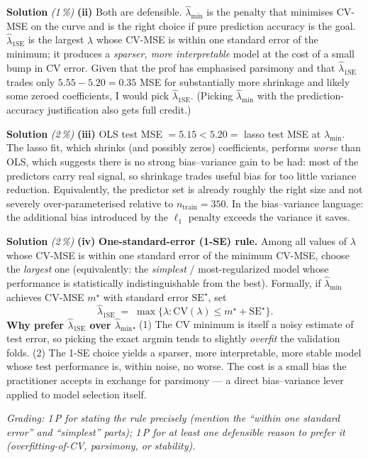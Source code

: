 \documentclass[11pt,a4paper]{article}
\newcommand{\subpoints}[1]{\textit{(#1\,\%)}}
\newcommand{\sol}{\noindent\textbf{Solution}}
\begin{document}
\medskip
\sol{} \subpoints{1} \textbf{(ii)} Both are defensible. \textbf{$\hat\lambda_{\min}$} is the
penalty that minimises CV-MSE on the curve and is the right choice if pure prediction accuracy is
the goal. \textbf{$\hat\lambda_{1\text{SE}}$} is the largest $\lambda$ whose CV-MSE is within one
standard error of the minimum; it produces a \emph{sparser, more interpretable} model at the cost
of a small bump in CV error. Given that the prof has emphasised parsimony and that
$\hat\lambda_{1\text{SE}}$ trades only $5.55-5.20 = 0.35$ MSE for substantially more shrinkage and
likely some zeroed coefficients, I would pick $\hat\lambda_{1\text{SE}}$. (Picking
$\hat\lambda_{\min}$ with the prediction-accuracy justification also gets full credit.)

\medskip
\sol{} \subpoints{2} \textbf{(iii)} OLS test MSE $=5.15<5.20=$ lasso test MSE at $\hat\lambda_{\min}$.
The lasso fit, which shrinks (and possibly zeros) coefficients, performs \emph{worse} than OLS,
which suggests there is no strong bias--variance gain to be had: most of the predictors carry real
signal, so shrinkage trades useful bias for too little variance reduction. Equivalently, the
predictor set is already roughly the right size and not severely over-parameterised relative to
$n_\text{train}=350$. In the bias--variance language: the additional bias introduced by the
$\ell_1$ penalty exceeds the variance it saves.

\medskip
\sol{} \subpoints{2} \textbf{(iv)} \textbf{One-standard-error (1-SE) rule.} Among all values of $\lambda$ whose CV-MSE is within one standard error of the minimum CV-MSE, choose the \emph{largest} one (equivalently: the \emph{simplest} / most-regularized model whose performance is statistically indistinguishable from the best). Formally, if $\hat\lambda_{\min}$ achieves CV-MSE $m^\star$ with standard error $\mathrm{SE}^\star$, set
$$\hat\lambda_{1\text{SE}} \;=\; \max\bigl\{\lambda : \mathrm{CV}(\lambda)\leq m^\star + \mathrm{SE}^\star\bigr\}.$$
\textbf{Why prefer $\hat\lambda_{1\text{SE}}$ over $\hat\lambda_{\min}$.} (1) The CV minimum is itself a noisy estimate of test error, so picking the exact argmin tends to slightly \emph{overfit} the validation folds. (2) The 1-SE choice yields a sparser, more interpretable, more stable model whose test performance is, within noise, no worse. The cost is a small bias the practitioner accepts in exchange for parsimony --- a direct bias--variance lever applied to model selection itself.

\noindent\emph{Grading: 1\,P for stating the rule precisely (mention the ``within one standard error'' and ``simplest'' parts); 1\,P for at least one defensible reason to prefer it (overfitting-of-CV, parsimony, or stability).}
\end{document}

